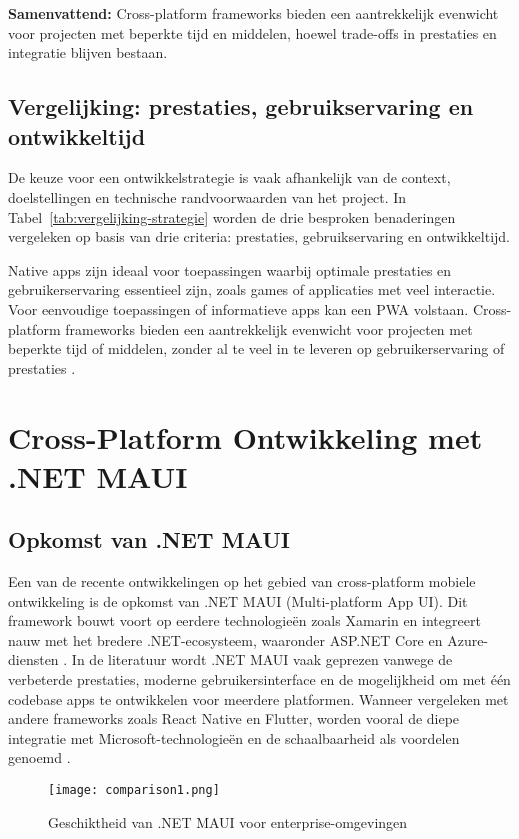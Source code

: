 \textbf{Samenvattend:} Cross-platform frameworks bieden een aantrekkelijk evenwicht voor projecten met beperkte tijd en middelen, hoewel trade-offs in prestaties en integratie blijven bestaan.

\subsection{Vergelijking: prestaties, gebruikservaring en ontwikkeltijd}
De keuze voor een ontwikkelstrategie is vaak afhankelijk van de context, doelstellingen en technische randvoorwaarden van het project. In Tabel~\ref{tab:vergelijking-strategie} worden de drie besproken benaderingen vergeleken op basis van drie criteria: prestaties, gebruikservaring en ontwikkeltijd.

Native apps zijn ideaal voor toepassingen waarbij optimale prestaties en gebruikerservaring essentieel zijn, zoals games of applicaties met veel interactie. Voor eenvoudige toepassingen of informatieve apps kan een PWA volstaan. Cross-platform frameworks bieden een aantrekkelijk evenwicht voor projecten met beperkte tijd of middelen, zonder al te veel in te leveren op gebruikerservaring of prestaties \autocite{Longe2025}.

\section{Cross-Platform Ontwikkeling met .NET MAUI}

\subsection{Opkomst van .NET MAUI}
Een van de recente ontwikkelingen op het gebied van cross-platform mobiele ontwikkeling is de opkomst van .NET MAUI (Multi-platform App UI). Dit framework bouwt voort op eerdere technologieën zoals Xamarin en integreert nauw met het bredere .NET-ecosysteem, waaronder ASP.NET Core en Azure-diensten \autocite{Klesman2023}. In de literatuur wordt .NET MAUI vaak geprezen vanwege de verbeterde prestaties, moderne gebruikersinterface en de mogelijkheid om met één codebase apps te ontwikkelen voor meerdere platformen. Wanneer vergeleken met andere frameworks zoals React Native en Flutter, worden vooral de diepe integratie met Microsoft-technologieën en de schaalbaarheid als voordelen genoemd \autocite{Kuppan2024}.

\begin{figure}
	\centering
	\texttt{[image: comparison1.png]}
	\caption[Integratie]{Geschiktheid van .NET MAUI voor enterprise-omgevingen}
\end{figure}

